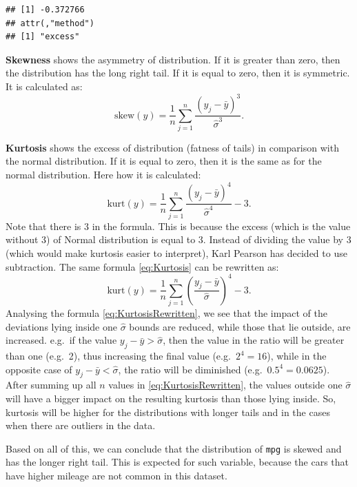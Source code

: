 \documentclass[
]{book}
\theoremstyle{definition}
\theoremstyle{definition}
\theoremstyle{definition}
\theoremstyle{definition}
\theoremstyle{remark}
\begin{document}
\begin{verbatim}
## [1] -0.372766
## attr(,"method")
## [1] "excess"
\end{verbatim}

\textbf{Skewness} shows the asymmetry of distribution. If it is greater than zero, then the distribution has the long right tail. If it is equal to zero, then it is symmetric. It is calculated as:
\begin{equation}
    \mathrm{skew}(y)= \frac{1}{n}\sum_{j=1}^n \frac{(y_j - \bar{y})^3}{\hat{\sigma}^3} .
    \label{eq:Skewness}
\end{equation}

\textbf{Kurtosis} shows the excess of distribution (fatness of tails) in comparison with the normal distribution. If it is equal to zero, then it is the same as for the normal distribution. Here how it is calculated:
\begin{equation}
    \mathrm{kurt}(y)= \frac{1}{n}\sum_{j=1}^n \frac{(y_j - \bar{y})^4}{\hat{\sigma}^4} - 3 .
    \label{eq:Kurtosis}
\end{equation}
Note that there is \(3\) in the formula. This is because the excess (which is the value without 3) of Normal distribution is equal to 3. Instead of dividing the value by 3 (which would make kurtosis easier to interpret), Karl Pearson has decided to use subtraction. The same formula \eqref{eq:Kurtosis} can be rewritten as:
\begin{equation}
    \mathrm{kurt}(y)= \frac{1}{n}\sum_{j=1}^n \left(\frac{y_j - \bar{y}}{\hat{\sigma}}\right)^4 - 3 .
    \label{eq:KurtosisRewritten}
\end{equation}
Analysing the formula \eqref{eq:KurtosisRewritten}, we see that the impact of the deviations lying inside one \(\hat{\sigma}\) bounds are reduced, while those that lie outside, are increased. e.g.~if the value \(y_j - \bar{y} > \hat{\sigma}\), then the value in the ratio will be greater than one (e.g.~2), thus increasing the final value (e.g.~\(2^4=16\)), while in the opposite case of \(y_j - \bar{y} < \hat{\sigma}\), the ratio will be diminished (e.g.~\(0.5^4 = 0.0625\)). After summing up all \(n\) values in \eqref{eq:KurtosisRewritten}, the values outside one \(\hat{\sigma}\) will have a bigger impact on the resulting kurtosis than those lying inside. So, kurtosis will be higher for the distributions with longer tails and in the cases when there are outliers in the data.

Based on all of this, we can conclude that the distribution of \texttt{mpg} is skewed and has the longer right tail. This is expected for such variable, because the cars that have higher mileage are not common in this dataset.
\end{document}
